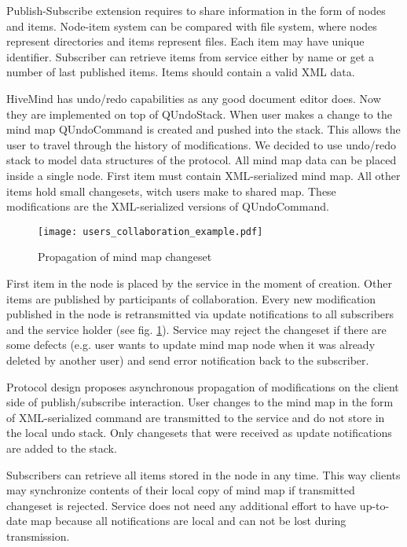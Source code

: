  Publish-Subscribe extension requires to share information in the form of nodes
 and items. Node-item system can be compared with file system, where nodes
 represent directories and items represent files. Each item may have unique
 identifier. Subscriber can retrieve items from service either by name or get a
 number of last published items. Items should contain a valid XML data.

 HiveMind has undo/redo capabilities as any good document editor does. Now they
 are implemented on top of QUndoStack. When user makes a change to the mind map
 QUndoCommand is created and pushed into the stack. This allows the user to
 travel through the history of modifications. We decided to use undo/redo stack
 to model data structures of the protocol. All mind map data can be placed
 inside a single node. First item must contain XML-serialized mind map. All other
 items hold small changesets, witch users make to shared map. These modifications
 are the XML-serialized versions of QUndoCommand.

 \begin{figure}[!h]
 \centering
 \texttt{[image: users\_collaboration\_example.pdf]}
 \caption{Propagation of mind map changeset}
 \label{users_collaboration_example}
 \end{figure} 

 First item in the node is placed by the service in the moment of creation. Other
 items are published by participants of collaboration. Every new modification
 published in the node is retransmitted via update notifications to all
 subscribers and the service holder (see fig. \ref{users_collaboration_example}). 
 Service may reject the changeset if there are some defects (e.g. user wants to 
 update mind map node when it was already deleted by another user) and send error
 notification back to the subscriber.

 Protocol design proposes asynchronous propagation of modifications on the client
 side of publish/subscribe interaction. User changes to the mind map in the form
 of XML-serialized command are transmitted to the service and do not store in
 the local undo stack. Only changesets that were received as update notifications
 are added to the stack.

 Subscribers can retrieve all items stored in the node in any time. This
 way clients may synchronize contents of their local copy of mind map if
 transmitted changeset is rejected. Service does not need any additional effort
 to have up-to-date map because all notifications are local and can not be lost
 during transmission.

